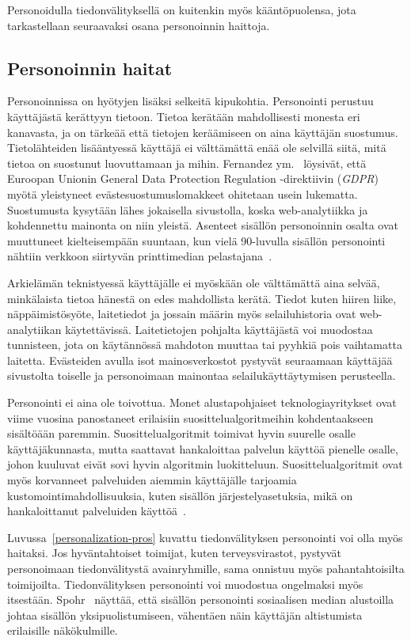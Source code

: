 \documentclass[finnish, 12pt, a4paper, elec, utf8, a-1b, online]{aaltothesis}
\begin{document}
Personoidulla tiedonvälityksellä on kuitenkin myös kääntöpuolensa, jota
tarkastellaan seuraavaksi osana personoinnin haittoja.

\subsection{Personoinnin haitat}\label{personalization-cons}

Personoinnissa on hyötyjen lisäksi selkeitä kipukohtia. Personointi perustuu
käyttäjästä kerättyyn tietoon. Tietoa kerätään mahdollisesti monesta eri
kanavasta, ja on tärkeää että tietojen keräämiseen on aina käyttäjän suostumus.
Tietolähteiden lisääntyessä käyttäjä ei välttämättä enää ole selvillä siitä,
mitä tietoa on suostunut luovuttamaan ja mihin. Fernandez
ym.~\cite{10.1145/3476087} löysivät, että Euroopan Unionin General Data
Protection Regulation -direktiivin (\textit{GDPR}) myötä yleistyneet
evästesuostumuslomakkeet ohitetaan usein lukematta. Suostumusta kysytään lähes
jokaisella sivustolla, koska web-analytiikka ja kohdennettu mainonta on niin
yleistä. Asenteet sisällön personoinnin osalta ovat muuttuneet kielteisempään
suuntaan, kun vielä 90-luvulla sisällön personointi nähtiin verkkoon siirtyvän
printtimedian pelastajana~\cite{adams_1995}.

Arkielämän teknistyessä käyttäjälle ei myöskään ole välttämättä aina selvää,
minkälaista tietoa hänestä on edes mahdollista kerätä. Tiedot kuten hiiren
liike, näppäimistösyöte, laitetiedot ja jossain määrin myös selailuhistoria ovat
web-analytiikan käytettävissä. Laitetietojen pohjalta käyttäjästä voi muodostaa
tunnisteen, jota on käytännössä mahdoton muuttaa tai pyyhkiä pois vaihtamatta
laitetta. Evästeiden avulla isot mainosverkostot pystyvät seuraamaan käyttäjää
sivustolta toiselle ja personoimaan mainontaa selailukäyttäytymisen perusteella.

Personointi ei aina ole toivottua. Monet alustapohjaiset teknologiayritykset
ovat viime vuosina panostaneet erilaisiin suosittelualgoritmeihin kohdentaakseen
sisältöään paremmin. Suosittelualgoritmit toimivat hyvin suurelle osalle
käyttäjäkunnasta, mutta saattavat hankaloittaa palvelun käyttöä pienelle osalle,
johon kuuluvat eivät sovi hyvin algoritmin luokitteluun. Suosittelualgoritmit
ovat myös korvanneet palveluiden aiemmin käyttäjälle tarjoamia
kustomointimahdollisuuksia, kuten sisällön järjestelyasetuksia, mikä on
hankaloittanut palveluiden käyttöä~\cite{patel_2022}.

Luvussa~\ref{personalization-pros} kuvattu tiedonvälityksen personointi voi olla
myös haitaksi. Jos hyväntahtoiset toimijat, kuten terveysvirastot, pystyvät
personoimaan tiedonvälitystä avainryhmille, sama onnistuu myös pahantahtoisilta
toimijoilta. Tiedonvälityksen personointi voi muodostua ongelmaksi myös
itsestään. Spohr~\cite{doi:10.1177/0266382117722446} näyttää, että sisällön
personointi sosiaalisen median alustoilla johtaa sisällön yksipuolistumiseen,
vähentäen näin käyttäjän altistumista erilaisille näkökulmille.
\end{document}
